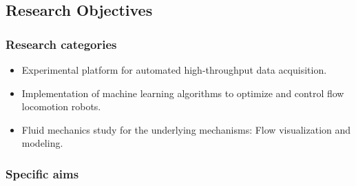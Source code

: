 \documentclass[12pt, a4paper]{article}
\providecommand{\tightlist}{%
  \setlength{\itemsep}{0pt}\setlength{\parskip}{0pt}}
\begin{document}
\hypertarget{research-objectives-1}{%
\subsection{Research Objectives}\label{research-objectives-1}}

\hypertarget{research-categories-1}{%
\subsubsection{Research categories}\label{research-categories-1}}

\begin{itemize}
\tightlist
\item
  Experimental platform for automated high-throughput data acquisition.
\item
  Implementation of machine learning algorithms to optimize and control
  flow locomotion robots.
\item
  Fluid mechanics study for the underlying mechanisms: Flow
  visualization and modeling.
\end{itemize}

\hypertarget{specific-aims-1}{%
\subsubsection{Specific aims}\label{specific-aims-1}}
\end{document}
